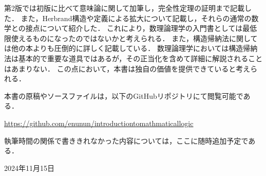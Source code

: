 第2版では初版に比べて意味論に関して加筆し，完全性定理の証明まで記載した．
また，Herbrand構造や定義による拡大について記載し，それらの通常の数学との接点について紹介した．
これにより，数理論理学の入門書としては最低限使えるものになったのではないかと考えられる．
また，構造帰納法に関しては他の本よりも圧倒的に詳しく記載している．
数理論理学においては構造帰納法は基本的で重要な道具ではあるが，その正当化を含めて詳細に解説されることはあまりない．
この点において，本書は独自の価値を提供できていると考えられる．

本書の原稿やソースファイルは，以下のGitHubリポジトリにて閲覧可能である．

\begin{center}
	\small
	\url{https://github.com/enunun/introductiontomathmaticallogic}
\end{center}

執筆時間の関係で書ききれなかった内容については，ここに随時追加予定である．

\begin{flushright}
	2024年11月15日
\end{flushright}